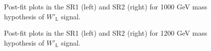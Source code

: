 \begin{figure}[H]
  \centering
  \caption{Post-fit plots in the SR1 (left) and SR2 (right) for 1000 GeV mass hypothesis of $W'_{\text{L}}$ signal.}
  \label{fig:Postfit_WpLH1000_Asimov}
\end{figure}
\begin{figure}[H]
  \centering
  \caption{Post-fit plots in the SR1 (left) and SR2 (right) for 1200 GeV mass hypothesis of $W'_{\text{L}}$ signal.}
  \label{fig:Postfit_WpLH1200_Asimov}
\end{figure}
